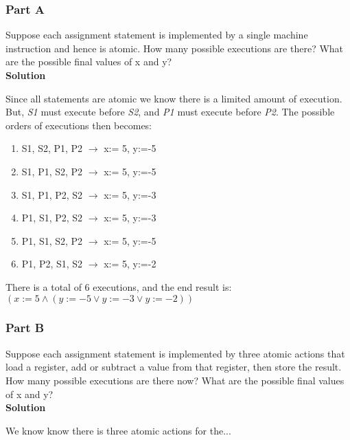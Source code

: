 \subsubsection{Part A}

Suppose each assignment statement is implemented by a single machine instruction and
hence is atomic. How many possible executions are there? What are the possible final
values of x and y? \\

\textbf{Solution}

Since all statements are atomic we know there is a limited amount of execution.
But, \textit{S1} must execute before \textit{S2}, and \textit{P1} must execute before \textit{P2}.
The possible orders of executions then becomes: 

\begin{enumerate}
    \item S1, S2, P1, P2 $\to$ x:= 5, y:=-5  
    \item S1, P1, S2, P2 $\to$ x:= 5, y:=-5
    \item S1, P1, P2, S2 $\to$ x:= 5, y:=-3
    \item P1, S1, P2, S2 $\to$ x:= 5, y:=-3
    \item P1, S1, S2, P2 $\to$ x:= 5, y:=-5
    \item P1, P2, S1, S2 $\to$ x:= 5, y:=-2
\end{enumerate}

There is a total of 6 executions, and the end result is: \\
$(x:=5 \land  (y:=-5 \lor y:=-3 \lor y:=-2))$ 


\subsubsection{Part B}

Suppose each assignment statement is implemented by three atomic actions that load a
register, add or subtract a value from that register, then store the result. How many
possible executions are there now? What are the possible final values of x and y? \\


\textbf{Solution}

We know know there is three atomic actions for the...

